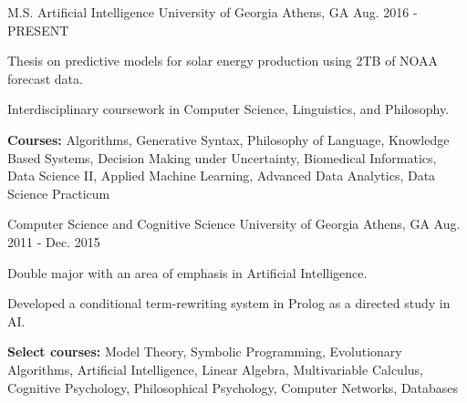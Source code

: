 \begin{cventries}

\cventry
{M.S. Artificial Intelligence}
{University of Georgia}
{Athens, GA}
{Aug. 2016 - PRESENT}
{\begin{cvitems}
    \item {Thesis on predictive models for solar energy production using 2TB of NOAA forecast data.}
    \item {Interdisciplinary coursework in Computer Science, Linguistics, and Philosophy.}
    \item {\textbf{Courses:} Algorithms, Generative Syntax, Philosophy of Language, Knowledge Based Systems, Decision Making under Uncertainty, Biomedical Informatics, Data Science II, Applied Machine Learning, Advanced Data Analytics, Data Science Practicum}
\end{cvitems}}

\cventry
{Computer Science and Cognitive Science}
{University of Georgia}
{Athens, GA}
{Aug. 2011 - Dec. 2015}
{\begin{cvitems}
    \item {Double major with an area of emphasis in Artificial Intelligence.}
    \item {Developed a conditional term-rewriting system in Prolog as a directed study in AI.}
    \item {\textbf{Select courses:} Model Theory, Symbolic Programming, Evolutionary Algorithms, Artificial Intelligence, Linear Algebra, Multivariable Calculus, Cognitive Psychology, Philosophical Psychology, Computer Networks, Databases}
\end{cvitems}}

\end{cventries}
